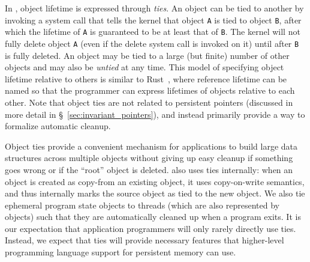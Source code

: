 In \Twizzler, object lifetime is expressed through \emph{ties}.
An object can be tied to another by invoking a system call that tells the kernel that
object \texttt{A} is tied to object \texttt{B}, after which the lifetime of \texttt{A} is
guaranteed to be at least that of \texttt{B}. The kernel will not fully delete object \texttt{A} (even if the
delete system call is invoked on it) until after \texttt{B} is fully deleted. An object may be tied
to a large (but finite) number of other objects and may also be \emph{untied} at any time. This
model of specifying object lifetime relative to others is similar to Rust~\cite{rust}, where
reference lifetime can be named so that the programmer can express lifetimes of objects relative to
each other. Note that object ties are not related to persistent pointers (discussed in more detail
in \S~\ref{sec:invariant_pointers}), and instead primarily provide a way to formalize automatic cleanup.


Object ties provide a convenient mechanism for applications to build large data structures across
multiple objects without giving up easy cleanup if something goes wrong or if the ``root'' object is
deleted. \Twizzler also uses ties internally: when an object is created as copy-from an existing
object, it uses copy-on-write semantics, and thus internally marks the source object as tied to the
new object. We also tie ephemeral program state objects to threads (which are also represented by
objects) such that they are automatically cleaned up when a program exits. It is our expectation
that application programmers will only rarely directly use ties. Instead, we expect that ties will
provide necessary features that higher-level programming language support for persistent memory can
use.

